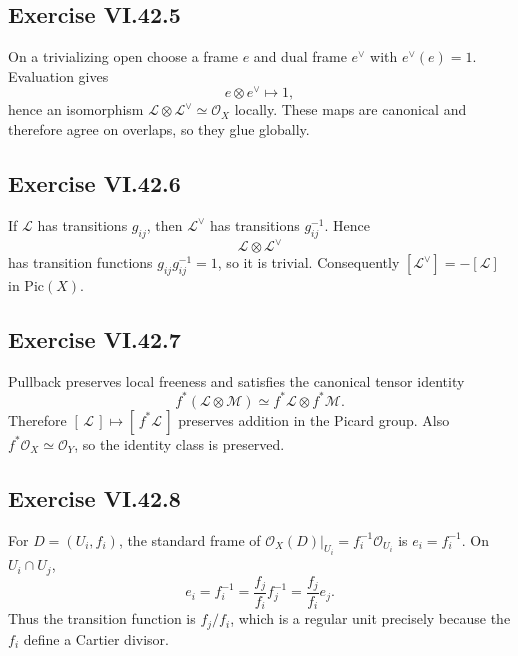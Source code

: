 \subsection*{Exercise VI.42.5}
\begin{solution}
On a trivializing open choose a frame \(e\) and dual frame \(e^\vee\) with \(e^\vee(e)=1\).  Evaluation gives
\[
e\otimes e^\vee\longmapsto1,
\]
hence an isomorphism \(\mathcal L\otimes\mathcal L^\vee\simeq\mathcal O_X\) locally.  These maps are canonical and therefore agree on overlaps, so they glue globally.
\end{solution}

\subsection*{Exercise VI.42.6}
\begin{solution}
If \(\mathcal L\) has transitions \(g_{ij}\), then \(\mathcal L^\vee\) has transitions \(g_{ij}^{-1}\).  Hence
\[
\mathcal L\otimes\mathcal L^\vee
\]
has transition functions \(g_{ij}g_{ij}^{-1}=1\), so it is trivial.  Consequently \([\mathcal L^\vee]=-[\mathcal L]\) in \(\mathrm{Pic}(X)\).
\end{solution}

\subsection*{Exercise VI.42.7}
\begin{solution}
Pullback preserves local freeness and satisfies the canonical tensor identity
\[
f^*(\mathcal L\otimes\mathcal M)\simeq f^*\mathcal L\otimes f^*\mathcal M.
\]
Therefore \([\,\mathcal L\,]\mapsto[\,f^*\mathcal L\,]\) preserves addition in the Picard group.  Also \(f^*\mathcal O_X\simeq\mathcal O_Y\), so the identity class is preserved.
\end{solution}

\subsection*{Exercise VI.42.8}
\begin{solution}
For \(D=(U_i,f_i)\), the standard frame of \(\mathcal O_X(D)|_{U_i}=f_i^{-1}\mathcal O_{U_i}\) is \(e_i=f_i^{-1}\).  On \(U_i\cap U_j\),
\[
e_i=f_i^{-1}=\frac{f_j}{f_i}f_j^{-1}=\frac{f_j}{f_i}e_j.
\]
Thus the transition function is \(f_j/f_i\), which is a regular unit precisely because the \(f_i\) define a Cartier divisor.
\end{solution}

